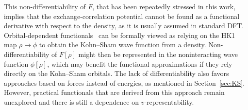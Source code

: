 \documentclass[journal=apcach,manuscript=article,layout=twocolumn]{achemso}
\newcommand{\changed}[1] {{ {#1}}} %
\begin{document}
\changed{
This non-differentiability of $F$, that has been repeatedly stressed in this work, implies that the exchange-correlation potential cannot be found as a functional derivative with respect to the density, as it is usually assumed in standard DFT.
Orbital-dependent functionals~\cite{KUMMEL_RMP80_3} can be formally viewed as relying on the HK1 map $\rho\mapsto\phi$ to obtain the Kohn--Sham wave function from a density. 
Non-differentiability of $F[\rho]$ might then be represented in the noninteracting wave function $\phi[\rho]$, which may benefit the functional approximations if they rely directly on the Kohn--Sham orbitals. 
%
The lack of differentiability also favors approaches based on forces instead of energies, as mentioned in Section~\ref{sec:KS}. However, practical functionals that are derived from this approach remain unexplored and there is still a dependence on $v$-representability.}
\end{document}
